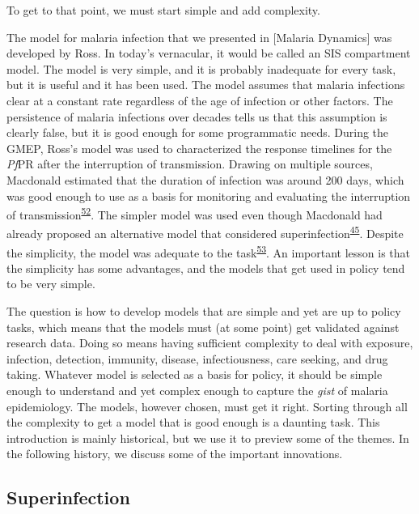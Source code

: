 \documentclass[
]{book}
\begin{document}
To get to that point, we must start simple and add complexity.

The model for malaria infection that we presented in {[}Malaria Dynamics{]} was developed by Ross. In today's vernacular, it would be called an SIS compartment model. The model is very simple, and it is probably inadequate for every task, but it is useful and it has been used. The model assumes that malaria infections clear at a constant rate regardless of the age of infection or other factors. The persistence of malaria infections over decades tells us that this assumption is clearly false, but it is good enough for some programmatic needs. During the GMEP, Ross's model was used to characterized the response timelines for the \emph{Pf}PR after the interruption of transmission. Drawing on multiple sources, Macdonald estimated that the duration of infection was around 200 days, which was good enough to use as a basis for monitoring and evaluating the interruption of transmission\textsuperscript{\protect\hyperlink{ref-MacdonaldG1964MalariaParasite}{52}}. The simpler model was used even though Macdonald had already proposed an alternative model that considered superinfection\textsuperscript{\protect\hyperlink{ref-MacdonaldG1950Superinfection}{45}}. Despite the simplicity, the model was adequate to the task\textsuperscript{\protect\hyperlink{ref-SmithDL2009EndemicityResponse}{53}}. An important lesson is that the simplicity has some advantages, and the models that get used in policy tend to be very simple.

The question is how to develop models that are simple and yet are up to policy tasks, which means that the models must (at some point) get validated against research data. Doing so means having sufficient complexity to deal with exposure, infection, detection, immunity, disease, infectiousness, care seeking, and drug taking. Whatever model is selected as a basis for policy, it should be simple enough to understand and yet complex enough to capture the \emph{gist} of malaria epidemiology. The models, however chosen, must get it right. Sorting through all the complexity to get a model that is good enough is a daunting task. This introduction is mainly historical, but we use it to preview some of the themes. In the following history, we discuss some of the important innovations.

\hypertarget{superinfection}{%
\subsection{Superinfection}\label{superinfection}}
\end{document}
